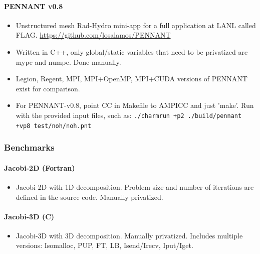 \documentclass[10pt]{article}
\begin{document}
\paragraph{PENNANT v0.8}
    \begin{itemize}
    \item
      Unstructured mesh Rad-Hydro mini-app for a full application at
      LANL called FLAG. \url{https://github.com/losalamos/PENNANT}
    \item
      Written in C++, only global/static variables that need to be
      privatized are mype and numpe. Done manually.
    \item
      Legion, Regent, MPI, MPI+OpenMP, MPI+CUDA versions of PENNANT
      exist for comparison.
    \item
      For PENNANT-v0.8, point CC in Makefile to AMPICC and just 'make'.
      Run with the provided input files, such as: \texttt{./charmrun +p2
      ./build/pennant +vp8 test/noh/noh.pnt}
    \end{itemize}


\subsubsection{Benchmarks}

\paragraph{Jacobi-2D (Fortran)}
    \begin{itemize}
    \item
      Jacobi-2D with 1D decomposition. Problem size and number of
      iterations are defined in the source code. Manually privatized.
    \end{itemize}

\paragraph{Jacobi-3D (C)}
    \begin{itemize}
    \item
      Jacobi-3D with 3D decomposition. Manually privatized. Includes multiple versions: Isomalloc, PUP, FT, LB,
      Isend/Irecv, Iput/Iget.
    \end{itemize}
\end{document}
